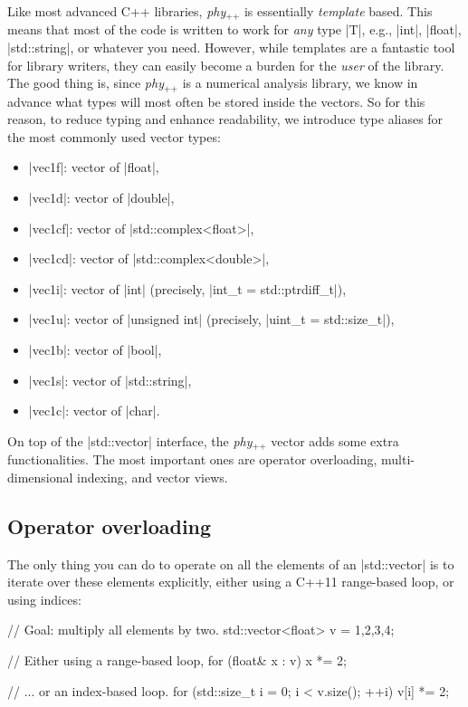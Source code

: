 \documentclass[12pt,a4paper]{report}
\newcommand{\phypp}{\textit{phy}$_{\text{++}}$\xspace}
\newcommand{\stdvec}{\cppinline|std::vector|\xspace}
\begin{document}
Like most advanced C++ libraries, \phypp is essentially \emph{template} based. This means that most of the code is written to work for \emph{any} type \cppinline|T|, e.g., \cppinline|int|, \cppinline|float|, \cppinline|std::string|, or whatever you need. However, while templates are a fantastic tool for library writers, they can easily become a burden for the \emph{user} of the library. The good thing is, since \phypp is a numerical analysis library, we know in advance what types will most often be stored inside the vectors. So for this reason, to reduce typing and enhance readability, we introduce type aliases for the most commonly used vector types:
\begin{itemize}
\item \cppinline|vec1f|: vector of \cppinline|float|,
\item \cppinline|vec1d|: vector of \cppinline|double|,
\item \cppinline|vec1cf|: vector of \cppinline|std::complex<float>|,
\item \cppinline|vec1cd|: vector of \cppinline|std::complex<double>|,
\item \cppinline|vec1i|: vector of \cppinline|int| (precisely, \cppinline|int_t = std::ptrdiff_t|),
\item \cppinline|vec1u|: vector of \cppinline|unsigned int| (precisely, \cppinline|uint_t = std::size_t|),
\item \cppinline|vec1b|: vector of \cppinline|bool|,
\item \cppinline|vec1s|: vector of \cppinline|std::string|,
\item \cppinline|vec1c|: vector of \cppinline|char|.
\end{itemize}

On top of the \stdvec interface, the \phypp vector adds some extra functionalities. The most important ones are operator overloading, multi-dimensional indexing, and vector views.

\subsection{Operator overloading \label{SEC:core:overview:overloading}}

The only thing you can do to operate on all the elements of an \stdvec is to iterate over these elements explicitly, either using a C++11 range-based loop, or using indices:
\begin{cppcode}
// Goal: multiply all elements by two.
std::vector<float> v = {1,2,3,4};

// Either using a range-based loop,
for (float& x : v) {
    x *= 2;
}

// ... or an index-based loop.
for (std::size_t i = 0; i < v.size(); ++i) {
    v[i] *= 2;
}
\end{cppcode}
\end{document}
